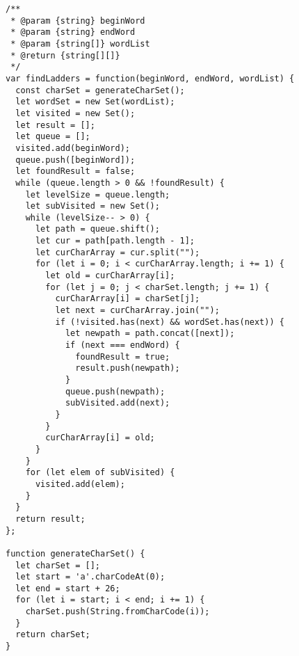 \begin{verbatim}
/**
 * @param {string} beginWord
 * @param {string} endWord
 * @param {string[]} wordList
 * @return {string[][]}
 */
var findLadders = function(beginWord, endWord, wordList) {
  const charSet = generateCharSet();
  let wordSet = new Set(wordList);
  let visited = new Set();
  let result = [];
  let queue = [];
  visited.add(beginWord);
  queue.push([beginWord]);
  let foundResult = false;
  while (queue.length > 0 && !foundResult) {
    let levelSize = queue.length;
    let subVisited = new Set();
    while (levelSize-- > 0) {
      let path = queue.shift();
      let cur = path[path.length - 1];
      let curCharArray = cur.split("");
      for (let i = 0; i < curCharArray.length; i += 1) {
        let old = curCharArray[i];
        for (let j = 0; j < charSet.length; j += 1) {
          curCharArray[i] = charSet[j];
          let next = curCharArray.join("");
          if (!visited.has(next) && wordSet.has(next)) {
            let newpath = path.concat([next]);
            if (next === endWord) {
              foundResult = true;
              result.push(newpath);
            }
            queue.push(newpath);
            subVisited.add(next);
          }
        }
        curCharArray[i] = old;
      }
    }
    for (let elem of subVisited) {
      visited.add(elem);
    }
  }
  return result;
};

function generateCharSet() {
  let charSet = [];
  let start = 'a'.charCodeAt(0);
  let end = start + 26;
  for (let i = start; i < end; i += 1) {
    charSet.push(String.fromCharCode(i));
  }
  return charSet;
}
\end{verbatim}
